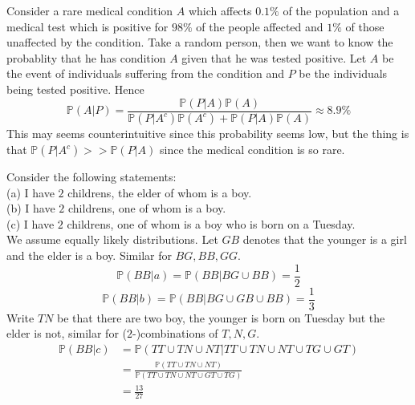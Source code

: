 \begin{example}
    Consider a rare medical condition $A$ which affects $0.1\%$ of the population and a medical test which is positive for $98\%$ of the people affected and $1\%$ of those unaffected by the condition.
    Take a random person, then we want to know the probablity that he has condition $A$ given that he was tested positive.
    Let $A$ be the event of individuals suffering from the condition and $P$ be the individuals being tested positive.
    Hence
    $$\mathbb P(A|P)=\frac{\mathbb P(P|A)\mathbb P(A)}{\mathbb P(P|A^c)\mathbb P(A^c)+\mathbb P(P|A)\mathbb P(A)}\approx 8.9\%$$
    This may seems counterintuitive since this probability seems low, but the thing is that $\mathbb P(P|A^c)>>\mathbb P(P|A)$ since the medical condition is so rare.
\end{example}
\begin{example}
    Consider the following statements:\\
    (a) I have $2$ childrens, the elder of whom is a boy.\\
    (b) I have $2$ childrens, one of whom is a boy.\\
    (c) I have $2$ childrens, one of whom is a boy who is born on a Tuesday.\\
    We assume equally likely distributions.
    Let $GB$ denotes that the younger is a girl and the elder is a boy.
    Similar for $BG,BB,GG$.
    $$\mathbb P(BB|a)=\mathbb P(BB|BG\cup BB)=\frac{1}{2}$$
    $$\mathbb P(BB|b)=\mathbb P(BB|BG\cup GB\cup BB)=\frac{1}{3}$$
    Write $TN$ be that there are two boy, the younger is born on Tuesday but the elder is not, similar for ($2$-)combinations of $T,N,G$.
    \begin{align*}
        \mathbb P(BB|c)&=\mathbb P(TT\cup TN\cup NT|TT\cup TN\cup NT\cup TG\cup GT)\\
        &=\frac{\mathbb P(TT\cup TN\cup NT)}{\mathbb P(TT\cup TN\cup NT\cup GT\cup TG)}\\
        &=\frac{13}{27}
    \end{align*}
\end{example}
